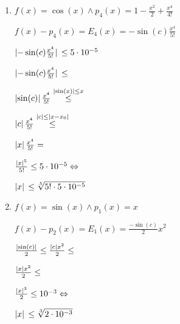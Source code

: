 \documentclass[../practica_05.tex]{subfiles}
\begin{document}
    \begin{enumerate}
        \item 

            $ f(x) = \cos(x) \wedge p_4(x) = 1 - \frac{x^2}{2} + \frac{x^4}{4!} $

            $ f(x) - p_4(x) = E_4(x) = -\sin(c)\frac{x^4}{5!}$

            $ \abs*{-\sin(c)\frac{x^4}{5!}} \leq 5\cdot10^{-5} $

            $ \abs*{-\sin(c)\frac{x^4}{5!}} \leq $

            $ \abs*{\sin(c)}\frac{x^4}{5!} \stackrel{\abs*{\sin(x)}\leq x}{\leq} $

            $ \abs*{c}\frac{x^4}{5!} \stackrel{\abs*{c} \leq \abs*{x - x_0}}{\leq} $

            $ \abs*{x}\frac{x^4}{5!} = $

            $ \frac{\abs*{x}^5}{5!} \leq 5 \cdot 10^{-5} \Leftrightarrow$

            $ \abs*{x}\leq \sqrt[5]{5! \cdot 5 \cdot 10^{-5}}$

        \item

            $ f(x) = \sin(x) \wedge p_1(x) = x $

            $ f(x) - p_2(x) = E_1(x) = \frac{-\sin(c)}{2}x^2 $

            $ \frac{\abs*{\sin(c)}}{2} \leq \frac{\abs*{c}x^2}{2} \leq $

            $ \frac{\abs*{x}x^2}{2} \leq  $

            $ \frac{\abs*{x}^3}{2} \leq 10^{-3} \Leftrightarrow$

            $ \abs*{x} \leq \sqrt[3]{2\cdot10^{-3}}$


    \end{enumerate}
\end{document}
